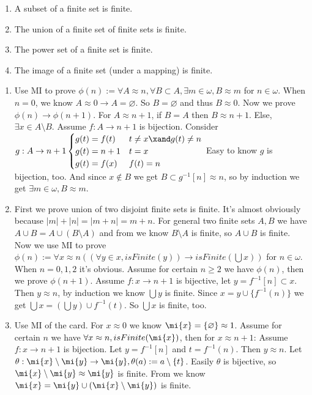 \documentclass{ctexart}
\begin{document}
\begin{problem}
 \begin{enumerate}[ref=\theproblem.\arabic*]
  \item\label{it:2.1} A subset of a finite set is finite.
  \item\label{it:2.2} The union of a finite set of finite sets is finite.
  \item The power set of a finite set is finite.
  \item The image of a finite set (under a mapping) is finite.
 \end{enumerate}
\end{problem}

\begin{solution}
 \begin{enumerate}
  \item Use MI to prove $\phi(n):=\forall A\approx n,\forall B\subset A,\exists m\in \omega,B\approx m$ for $n\in \omega$. When $n=0$, we know $A\approx 0\to A=\varnothing$. So $B=\varnothing$ and thus $B\approx 0$. Now we prove $\phi(n)\to \phi(n+1)$. For $A\approx n+1$, if $B=A$ then $B\approx n+1$. Else, $\exists x\in A\setminus B$. Assume $f:A\to n+1$ is bijection. Consider $g:A\to n+1
  \begin{cases}
   g(t)=f(t) & t\neq x\xand g(t)\neq n\\
   g(t)=n+1  &t=x\\
   g(t)=f(x) &f(t)=n
  \end{cases}$
  Easy to know $g$ is bijection, too. And since $x\notin B$ we get $B\subset g^{-1}[n]\approx n$, so by induction we get $\exists m\in \omega,B\approx m$. 
  \item First we prove union of two disjoint finite sets is finite. It's almost obviously because $|m|+|n|=|m+n|=m+n$. For general two finite sets $A,B$ we have $A\cup B=A\cup (B\setminus A)$ and from  we know $B\setminus A$ is finite, so $A\cup B$ is finite. Now we use MI to prove $\phi(n):=\forall x\approx n((\forall y\in x,isFinite(y))\to isFinite(\bigcup x))$ for $n\in \omega$. When $n=0,1,2$ it's obvious. Assume for certain $n\geq 2$ we have $\phi(n)$, then we prove $\phi(n+1)$. Assume $f:x\to n+1$ is bijective, let $y=f^{-1}[n]\subset x$. Then $y\approx n$, by induction we know $\bigcup y$ is finite. Since $x=y\cup \{f^{-1}(n)\}$ we get $\bigcup x=(\bigcup y)\cup f^{-1}(t)$. So $\bigcup x$ is finite, too.
  \item Use MI of the card. For $x\approx 0$ we know $\mi{x}=\{\varnothing\}\approx 1$. Assume for certain $n$ we have $\forall x\approx n,isFinite(\mi{x})$, then for $x\approx n+1$: Assume $f:x\to n+1$ is bijection. Let $y=f^{-1}[n]$ and $t=f^{-1}(n)$. Then $y\approx n$. Let $\theta:\mi{x}\setminus \mi{y}\to \mi{y},\theta(a):=a\setminus \{t\}$. Easily $\theta$ is bijective, so $\mi{x}\setminus\mi{y}\approx \mi{y}$ is finite. From  we know $\mi{x}=\mi{y}\cup(\mi{x}\setminus\mi{y})$ is finite. 

\end{enumerate}
\end{solution}
\end{document}
